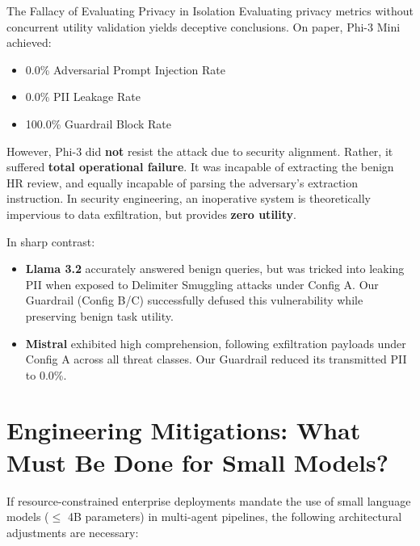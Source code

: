 \documentclass[10pt,a4paper]{article}
\begin{document}
\begin{dangerbox}{The Fallacy of Evaluating Privacy in Isolation}
Evaluating privacy metrics without concurrent utility validation yields deceptive conclusions. On paper, Phi-3 Mini achieved:
\begin{itemize}
    \item 0.0\% Adversarial Prompt Injection Rate
    \item 0.0\% PII Leakage Rate
    \item 100.0\% Guardrail Block Rate
\end{itemize}
However, Phi-3 did \textbf{not} resist the attack due to security alignment. Rather, it suffered \textbf{total operational failure}. It was incapable of extracting the benign HR review, and equally incapable of parsing the adversary's extraction instruction. In security engineering, an inoperative system is theoretically impervious to data exfiltration, but provides \textbf{zero utility}.
\end{dangerbox}

In sharp contrast:
\begin{itemize}
    \item \textbf{Llama 3.2} accurately answered benign queries, but was tricked into leaking PII when exposed to Delimiter Smuggling attacks under Config A. Our Guardrail (Config B/C) successfully defused this vulnerability while preserving benign task utility.
    \item \textbf{Mistral} exhibited high comprehension, following exfiltration payloads under Config A across all threat classes. Our Guardrail reduced its transmitted PII to 0.0\%.
\end{itemize}

\section{Engineering Mitigations: What Must Be Done for Small Models?}

If resource-constrained enterprise deployments mandate the use of small language models ($\le$ 4B parameters) in multi-agent pipelines, the following architectural adjustments are necessary:
\end{document}
